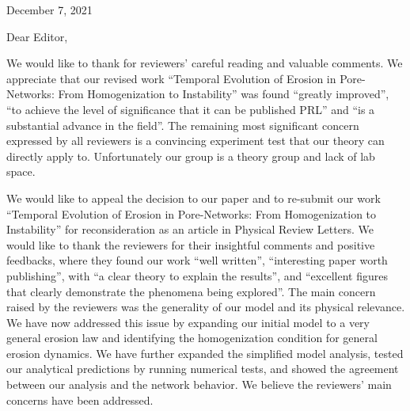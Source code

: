 \documentclass[11pt]{harvardletter}
\date{} %
\newcommand{\add}[1]{\noindent \color{blue} #1 \normalcolor}
\begin{document}
\vspace{-14mm}
\begin{letter}{}
\vspace{-21mm}
\hfill{December 7, 2021}
\vspace{7mm}



\vspace{-7mm}


\opening{Dear Editor,}
\add{
We would like to thank for reviewers' careful reading and valuable comments. We appreciate that our revised work ``Temporal Evolution of Erosion in Pore-Networks: From Homogenization to Instability'' was found  ``greatly improved'', ``to achieve the level of significance that it can be published PRL'' and ``is a substantial advance in the field''. The remaining most significant concern expressed by all reviewers is a convincing experiment test that our theory can directly apply to. Unfortunately our group is a theory group and lack of lab space. 
}

We would like to appeal the decision to our paper and to re-submit our work ``Temporal Evolution of Erosion in Pore-Networks: From Homogenization to Instability'' for reconsideration as an article in Physical Review Letters. We would like to thank the reviewers for their insightful comments and positive feedbacks, where they found our work ``well written'', ``interesting paper worth publishing'', with ``a clear theory to explain the results'', and ``excellent figures that clearly demonstrate the phenomena being explored''. The main concern raised by the reviewers was the generality of our model and its physical relevance. We have now addressed this issue by expanding our initial model to a very general erosion law and identifying the homogenization condition for general erosion dynamics. We have further expanded the simplified model analysis, tested our analytical predictions by running numerical tests, and showed the agreement between our analysis and the network behavior. We believe the reviewers' main concerns have been addressed. 


\end{letter}
\end{document}
